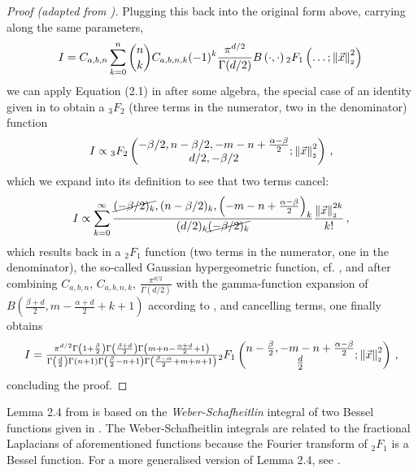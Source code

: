 \begin{proof}[Proof (adapted from \cite{2021-arbitrary-dimensions})]
  Plugging this back into the original form above, carrying along the same parameters,
  \begin{align*}
    I = C_{a,b,n} \sum_{k=0}^n \binom{n}{k} C_{a,b,n,k} (-1)^k \frac{\pi^{d/2}}{\Gamma(d/2)} B\left(\cdot, \cdot\right) {}_2F_1\left(\dots; \left\lVert\vec{x}\right\rVert_{\scriptscriptstyle 2}^2\right)\,
  \end{align*}
  we can apply Equation (2.1) in \cite{2021-arbitrary-dimensions} after some algebra, the special case of an identity given in \cite{1986-crazy-hypergeometric-properties} to obtain a ${}_3F_2$ (three terms in the numerator, two in the denominator) function
  \begin{align*}
    I \propto {}_3F_2\left(\begin{matrix}-\beta/2, n-\beta/2, -m-n+\frac{\alpha-\beta}{2} \\d/2, -\beta/2\end{matrix}; \left\lVert\vec{x}\right\rVert_{\scriptscriptstyle 2}^2\right)\,,
  \end{align*}
  which we expand into its definition  to see that two terms cancel:
  \begin{align*}
    I \propto \sum_{k=0}^{\infty} \frac{\cancel{(-\beta/2)_k}, (n-\beta/2)_k, \left(-m-n+\frac{\alpha-\beta}{2}\right)_k}{(d/2)_k \cancel{(-\beta/2)_k}} \frac{\left\lVert\vec{x}\right\rVert_{\scriptscriptstyle 2}^{2k}}{k!}\,,
  \end{align*}
  which results back in a ${}_2F_1$ function (two terms in the numerator, one in the denominator), the so-called Gaussian hypergeometric function, cf. , and after combining $C_{a,b,n}$, $C_{a,b,n,k}$, $\frac{\pi^{d/2}}{\Gamma(d/2)}$ with the gamma-function expansion of $B\left(\tfrac{\beta+d}{2}, m-\tfrac{\alpha+d}{2}+k+1\right)$ according to , and cancelling terms, one finally obtains
  $$I = \tfrac{\pi^{d/2} \Gamma \left(1+\frac{\beta}{2}\right) \Gamma \left(\frac{\beta+d}{2}\right) \Gamma \left(m+n-\frac{\alpha+d}{2}+1\right)}{\Gamma \left(\frac{d}{2}\right) \Gamma (n+1) \Gamma \left(\frac{\beta}{2}-n+1\right) \Gamma \left(\frac{\beta-\alpha}{2}+m+n+1\right)}{}_2F_1\left(\begin{matrix}n-\frac{\beta}{2}, -m-n+\frac{\alpha-\beta}{2} \\\frac{d}{2}\end{matrix};\left\lVert\vec{x}\right\rVert_{\scriptscriptstyle 2}^2\right)\,,$$
  concluding the proof.
\end{proof}

Lemma 2.4 from \cite{2011-porous-medium-1,1967-formulas-and-theorems} is based on the \textit{Weber-Schafheitlin} integral of two Bessel functions given in \cite{1945-bessel-integral}.
The Weber-Schafheitlin integrals are related to the fractional Laplacians of aforementioned functions because the Fourier transform of ${}_2F_1$ is a Bessel function.
For a more generalised version of Lemma 2.4, see \cite{2014-barenblatt}.
